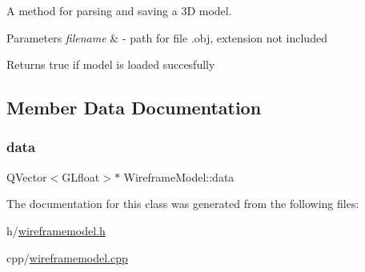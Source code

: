 A method for parsing and saving a 3D model. 


\begin{DoxyParams}{Parameters}
{\em filename} & -\/ path for file .obj, extension not included \\
\hline
\end{DoxyParams}
\begin{DoxyReturn}{Returns}
true if model is loaded succesfully 
\end{DoxyReturn}


\subsection{Member Data Documentation}
\mbox{\label{class_wireframe_model_a9fb28b2dedbdcfff31c9ccc592b8492a}} 
\subsubsection{\texorpdfstring{data}{data}}
{\footnotesize\ttfamily Q\+Vector$<$G\+Lfloat$>$$\ast$ Wireframe\+Model\+::data\hspace{0.3cm}{\ttfamily [private]}}



The documentation for this class was generated from the following files\+:\begin{DoxyCompactItemize}
\item 
h/\mbox{\hyperlink{wireframemodel_8h}{wireframemodel.\+h}}\item 
cpp/\mbox{\hyperlink{wireframemodel_8cpp}{wireframemodel.\+cpp}}\end{DoxyCompactItemize}
